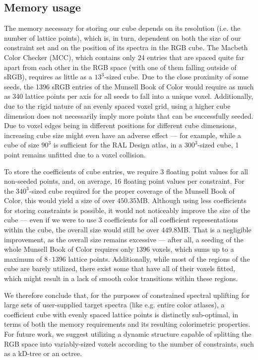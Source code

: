 \subsection{Memory usage} \label{ssec:memoryUsage}
The memory necessary for storing our cube depends on its resolution (i.e. the number of lattice points), which is, in turn, dependent on both the size of our constraint set and on the position of its spectra in the RGB cube. The Macbeth Color Checker (MCC), which contains only 24 entries that are spaced quite far apart from each other in the RGB space (with one of them falling outside of sRGB), requires as little as a $13^3$-sized cube. Due to the close proximity of some seeds, the 1396 sRGB entries of the Munsell Book of Color would require as much as 340 lattice points per axis for all seeds to fall into a unique voxel. Additionally, due to the rigid nature of an evenly spaced voxel grid, using a higher cube dimension does not necessarily imply more points that can be successfully seeded. Due to voxel edges being in different positions for different cube dimensions, increasing cube size might even have an adverse effect --- for example, while a cube of size $90^3$ is sufficient for the RAL Design atlas, in a $300^3$-sized cube, 1 point remains unfitted due to a voxel collision.

To store the coefficients of cube entries, we require 3 floating point values for all non-seeded points, and, on average, 16 floating point values per constraint. For the $340^3$-sized cube required for the proper coverage of the Munsell Book of Color, this would yield a size of over $450.35$MB. Although using less coefficients for storing constraints is possible, it would not noticeably improve the size of the cube --- even if we were to use 3 coefficients for all coefficient representations within the cube, the overall size would still be over $449.8$MB. That is a negligible improvement, as the overall size remains excessive --- after all, a seeding of the whole Munsell Book of Color requires only $1396$ voxels, which sums up to a maximum of $8\cdot1396$ lattice points. Additionally, while most of the regions of the cube are barely utilized, there exist some that have all of their voxels fitted, which might result in a lack of smooth color transitions within these regions.

We therefore conclude that, for the purposes of constrained spectral uplifting for large sets of user-supplied target spectra (like e.g. entire color atlases), a coefficient cube with evenly spaced lattice points is distinctly sub-optimal, in terms of both the memory requirements and its resulting colorimetric properties. For future work, we suggest utilizing a dynamic structure capable of splitting the RGB space into variably-sized voxels according to the number of constraints, such as a kD-tree or an octree.

